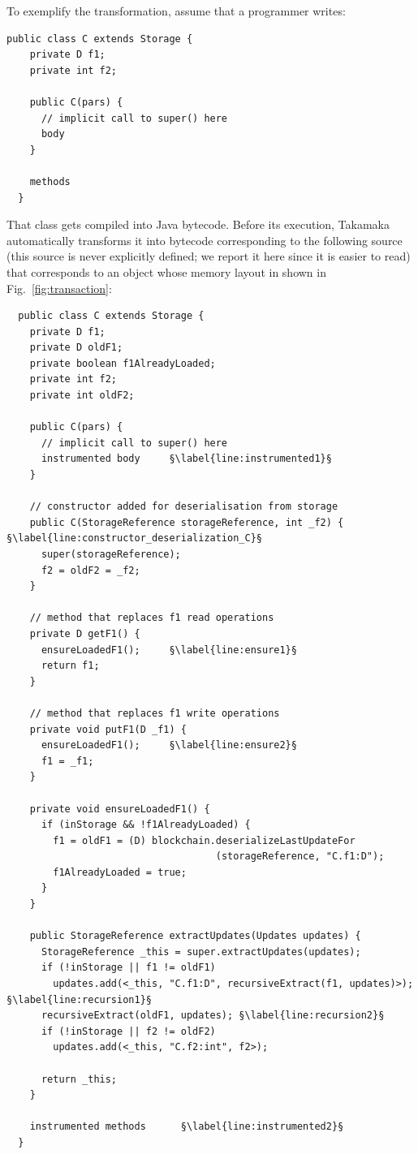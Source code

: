 \documentclass[10pt]{llncs}
\begin{document}
To exemplify the transformation, assume that a programmer writes:
%
\begin{lstlisting}[numbers=none,frame=none]
  public class C extends Storage {
    private D f1;
    private int f2;

    public C(pars) {
      // implicit call to super() here
      body
    }

    methods
  }
\end{lstlisting}
%
That class gets compiled into Java bytecode. Before its execution,
Takamaka automatically transforms it into bytecode corresponding to
the following source (this source is never explicitly
defined; we report it here since it is easier to read)
that corresponds to an object whose memory layout in shown
in Fig.~\ref{fig:transaction}:
%
\begin{lstlisting}
  public class C extends Storage {
    private D f1;
    private D oldF1;
    private boolean f1AlreadyLoaded;
    private int f2;
    private int oldF2;

    public C(pars) {
      // implicit call to super() here
      instrumented body     §\label{line:instrumented1}§
    }

    // constructor added for deserialisation from storage
    public C(StorageReference storageReference, int _f2) { §\label{line:constructor_deserialization_C}§
      super(storageReference);
      f2 = oldF2 = _f2;
    }

    // method that replaces f1 read operations
    private D getF1() {
      ensureLoadedF1();     §\label{line:ensure1}§
      return f1;
    }

    // method that replaces f1 write operations
    private void putF1(D _f1) {
      ensureLoadedF1();     §\label{line:ensure2}§
      f1 = _f1;
    }

    private void ensureLoadedF1() {
      if (inStorage && !f1AlreadyLoaded) {
        f1 = oldF1 = (D) blockchain.deserializeLastUpdateFor
                                    (storageReference, "C.f1:D");
        f1AlreadyLoaded = true;
      }
    }

    public StorageReference extractUpdates(Updates updates) {
      StorageReference _this = super.extractUpdates(updates);
      if (!inStorage || f1 != oldF1)
        updates.add(<_this, "C.f1:D", recursiveExtract(f1, updates)>); §\label{line:recursion1}§
      recursiveExtract(oldF1, updates); §\label{line:recursion2}§
      if (!inStorage || f2 != oldF2)
        updates.add(<_this, "C.f2:int", f2>);

      return _this;
    }

    instrumented methods      §\label{line:instrumented2}§
  }
\end{lstlisting}
\end{document}
